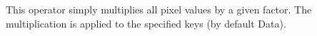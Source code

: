 This operator simply multiplies all pixel values by a given
factor. The multiplication is applied to the specified keys (by
default {\ttfamily Data}).
